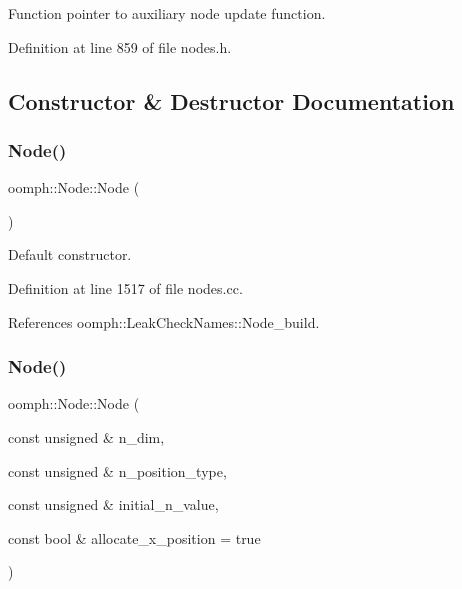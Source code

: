 Function pointer to auxiliary node update function. 



Definition at line 859 of file nodes.\+h.



\subsection{Constructor \& Destructor Documentation}
\mbox{\label{classoomph_1_1Node_af40c4014b1d7f30ed2142330fa5f1e68}} 
\subsubsection{\texorpdfstring{Node()}{Node()}\hspace{0.1cm}{\footnotesize\ttfamily [1/4]}}
{\footnotesize\ttfamily oomph\+::\+Node\+::\+Node (\begin{DoxyParamCaption}{ }\end{DoxyParamCaption})}



Default constructor. 



Definition at line 1517 of file nodes.\+cc.



References oomph\+::\+Leak\+Check\+Names\+::\+Node\+\_\+build.

\mbox{\label{classoomph_1_1Node_aca6c40f3a7bb1943b413a466d32c6970}} 
\subsubsection{\texorpdfstring{Node()}{Node()}\hspace{0.1cm}{\footnotesize\ttfamily [2/4]}}
{\footnotesize\ttfamily oomph\+::\+Node\+::\+Node (\begin{DoxyParamCaption}\item[{const unsigned \&}]{n\+\_\+dim,  }\item[{const unsigned \&}]{n\+\_\+position\+\_\+type,  }\item[{const unsigned \&}]{initial\+\_\+n\+\_\+value,  }\item[{const bool \&}]{allocate\+\_\+x\+\_\+position = {\ttfamily true} }\end{DoxyParamCaption})}



